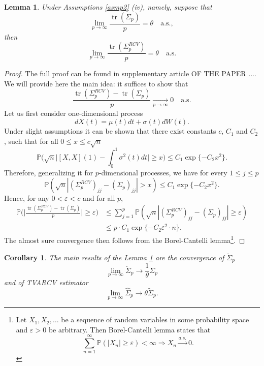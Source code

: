\documentclass[a4paper,11pt]{book}
\theoremstyle{plain}
\newtheorem{lmm}[thm]{Lemma}
\newtheorem{crlr}[thm]{Corollary}
\theoremstyle{definition}
\newcommand{\MP}{\mathbb{P}}
\newcommand{\tr}{\operatorname{tr}}
\begin{document}
    \begin{lmm} \label{trace conv}
    	Under Assumptions \ref{asmp2} (iv), namely, suppose that
    	\[ \lim_{p \rightarrow \infty} \frac{\tr(\Sigma_p)}{p} = \theta \quad \text{a.s.}, \]
    	then
    	\[ \lim_{p \rightarrow \infty} \frac{\tr(\Sigma_p^{RCV})}{p} = \theta \quad \text{a.s.} \]
    \end{lmm}
    \begin{proof}
    	The full proof can be found in supplementary article OF THE PAPER .... We will provide here the main idea: it suffices to show that
    	\[ \frac{\tr(\Sigma_p^{RCV})-\tr(\Sigma_p)}{p} \xrightarrow[p \rightarrow \infty]{} 0 \quad \text{a.s.} \]
    	Let us first consider one-dimensional process
    	\[ dX(t) = \mu(t)dt + \sigma(t)dW(t). \]
    	Under slight assumptions it can be shown that there exist constants $c$, $C_1$ and $C_2$, such that for all $0 \leq x \leq c \sqrt{n}$
    	\[\MP\Big(\sqrt{n} \Big| [X, X](1) - \int_{0}^{1} \sigma^2(t)dt \Big| \geq x \Big) \leq C_1 \exp \{ -C_2 x^2 \}. \]
    	Therefore, generalizing it for $p$-dimensional processes, we have for every $1 \leq j \leq p$
    	\[ \MP(\sqrt{n} |(\Sigma_p^{RCV})_{jj} - (\Sigma_p)_{jj} | > x) \leq C_1 \exp \{ -C_2 x^2 \}. \]
    	Hence, for any $0 < \varepsilon < c$ and for all $p$,
    	\[ 
    	\begin{aligned}
    	\MP \Bigg(  \Bigg| \frac{\tr(\Sigma_p^{RCV})-\tr(\Sigma_p)}{p}  \Bigg| \geq \varepsilon \Bigg) & \leq \sum_{j=1}^{p} \MP(\sqrt{n} |(\Sigma_p^{RCV})_{jj} - (\Sigma_p)_{jj} | \geq \varepsilon) \\
    	& \leq p \cdot C_1 \exp \{ -C_2 \varepsilon^2 \cdot n  \}.
    	\end{aligned}
    	\]
    	The almost sure convergence then follows from the Borel-Cantelli lemma\footnote{
    		Let $X_1, X_2, \dots$ be a sequence of random variables in some probability space and $\varepsilon > 0$ be arbitrary.
    		Then Borel-Cantelli lemma states that
    		\[ \sum_{n=1}^{\infty} \MP(|X_n| \geq \varepsilon) < \infty \Longrightarrow X_n \xrightarrow{a.s.} 0.  \]
    	}.
    \end{proof}
    
    \begin{crlr} \label{crlr trace conv}
    	The main results of the Lemma \ref{trace conv} are the convergence of $\breve{\Sigma}_p$ 
    	\[ \lim_{p \rightarrow \infty} \breve{\Sigma}_p \rightarrow \frac{1}{\theta} \Sigma_p \]
    	and of TVARCV estimator
    	\[ \lim_{p \rightarrow \infty} \widehat{\Sigma}_p \rightarrow \theta \widetilde{\Sigma}_p. \]
    \end{crlr}
    
\end{document}
